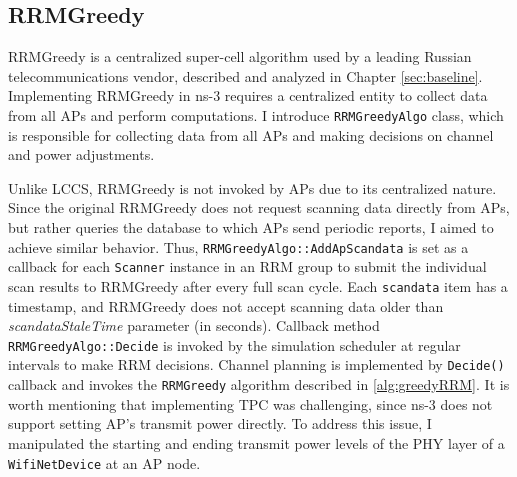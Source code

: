 



\subsection{RRMGreedy}
\label{chap:impl:sec:implementation:rrmgreedy}
RRMGreedy is a centralized super-cell algorithm used by a leading Russian telecommunications vendor, described and analyzed in Chapter \ref{sec:baseline}.
Implementing RRMGreedy in ns-3 requires a centralized entity to collect data from all APs and perform computations. I introduce \texttt{RRMGreedyAlgo} class, which is responsible for collecting data from all APs and making decisions on channel and power adjustments.

Unlike LCCS, RRMGreedy is not invoked by APs due to its centralized nature. Since the original RRMGreedy does not request scanning data directly from APs, but rather queries the database to which APs send periodic reports, I aimed to achieve similar behavior.
Thus, \texttt{RRMGreedyAlgo::AddApScandata} is set as a callback for each \texttt{Scanner} instance in an RRM group to submit the individual scan results to RRMGreedy after every full scan cycle. Each \texttt{scandata} item has a timestamp, and RRMGreedy does not accept scanning data older than \textit{scandataStaleTime} parameter (in seconds). Callback method \texttt{RRMGreedyAlgo::Decide} is invoked by the simulation scheduler at regular intervals to make RRM decisions.
Channel planning is implemented by \texttt{Decide()} callback and invokes the \texttt{RRMGreedy} algorithm described in \ref{alg:greedyRRM}. It is worth mentioning that implementing TPC was challenging, since ns-3 does not support setting AP's transmit power directly. To address this issue, I manipulated the starting and ending transmit power levels of the PHY layer of a \texttt{WifiNetDevice} at an AP node.

